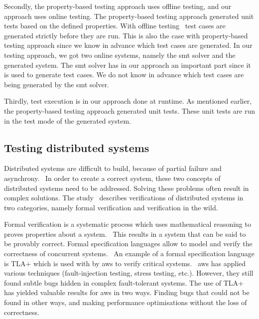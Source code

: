 Secondly, the property-based testing approach uses offline testing, and our
approach uses online testing. The property-based testing approach generated unit
tests based on the defined properties.
With offline testing~\cite{utting2012taxonomy} test cases are generated strictly
before they are run. This is also the case with property-based testing approach
since we know in advance which test cases are generated.
In our testing approach, we got two online systems, namely the \gls{smt} solver
and the generated system. The \gls{smt} solver has in our approach an important
part since it is used to generate test cases. We do not know in advance which
test cases are being generated by the \gls{smt} solver.

Thirdly, test execution is in our approach done at runtime.
As mentioned earlier, the property-based testing approach generated unit tests.
These unit tests are run in the test mode of the generated system.

\subsection*{Testing distributed systems}

Distributed systems are difficult to build, because of partial failure and
asynchrony.~\cite[p.~1]{mccaffrey2016verification}
In order to create a correct system, these two concepts of distributed systems
need to be addressed. Solving these problems often result in complex solutions.
The study~\cite{mccaffrey2016verification} describes verifications of
distributed systems in two categories, namely formal verification and
verification in the wild.

Formal verification is a systematic process which uses mathematical reasoning to
proves properties about a system.~\cite{mccaffrey2016verification, sanghavi2010formal}
This results in a system that can be said to be provably correct.
Formal specification languages allow to model and verify the correctness of
concurrent systems.~\cite[p.~2]{mccaffrey2016verification}
An example of a formal specification language is TLA+ which is used with by
\gls{aws} to verify critical systems.~\cite[p.~1]{newcombe2014use}
\gls{aws} has applied various techniques (fault-injection testing, stress testing,
etc.). However, they still found subtle bugs hidden in complex fault-tolerant
systems.
The use of TLA+ has yielded valuable results for \gls{aws} in two ways. Finding
bugs that could not be found in other ways, and making performance optimisations
without the loss of correctness.~\cite[p.~3]{newcombe2014use}

